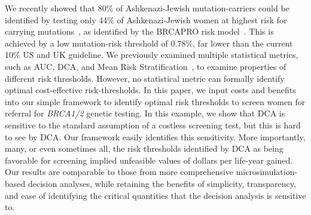 \documentclass[AMA,STIX1COL]{WileyNJD-v2}
\begin{document}
We recently showed that 80\% of Ashkenazi-Jewish mutation-carriers could be identified by testing only 44\% of Ashkenazi-Jewish women at highest risk for carrying mutations~\citep{Best2019}, as identified by the BRCAPRO risk model~\citep{Parmigiani1998}.  This is achieved by a low mutation-risk threshold of 0.78\%, far lower than the current 10\% US and UK guideline.  We previously examined multiple statistical metrics, such as AUC, DCA, and Mean Risk Stratification~\citep{Katki2019}, to examine properties of different risk thresholds.  However, no statistical metric can formally identify optimal cost-effective risk-thresholds.  In this paper, we input costs and benefits into our simple framework to identify optimal risk thresholds to screen women for referral for \textit{BRCA1/2} genetic testing.  In this example, we show that DCA is sensitive to the standard assumption of a costless screening test, but this is hard to see by DCA.  Our framework easily identifies this sensitivity.  More importantly, many, or even sometimes all, the risk thresholds identified by DCA as being favorable for screening implied unfeasible values of dollars per life-year gained.  Our results are comparable to those from more comprehensive microsimulation-based decision analyses, while retaining the benefits of simplicity, transparency, and ease of identifying the critical quantities that the decision analysis is sensitive to.





\end{document}
